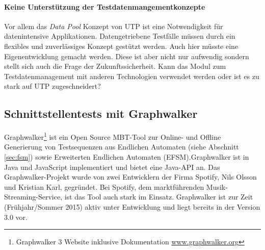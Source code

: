 \paragraph{Keine Unterstützung der Testdatenmangementkonzepte}
Vor allem das \textit{Data Pool} Konzept von UTP ist eine Notwendigkeit für datenintensive Applikationen. Datengetriebene Testfälle müssen durch ein flexibles und zuverlässiges Konzept gestützt werden. Auch hier müsste eine Eigenentwicklung gemacht werden. Diese ist aber nicht nur aufwendig sondern stellt sich auch die Frage der Zukunftssicherheit. Kann das Modul zum Testdatenmanagement mit anderen Technologien verwendet werden oder ist es zu stark auf UTP zugeschneidert?

\subsection{Schnittstellentests mit Graphwalker}
Graphwalker\footnote{Graphwalker 3 Website inklusive Dokumentation \url{www.graphwalker.org}} ist ein Open Source MBT-Tool zur Online- und Offline Generierung von Testsequenzen aus Endlichen Automaten (siehe Abschnitt \ref{sec:fsm}) sowie Erweiterten Endlichen Automaten (EFSM).Graphwalker ist in Java und JavaScript implementiert und bietet eine Java-API an. Das Graphwalker-Projekt wurde von zwei Entwicklern der Firma Spotify, Nils Olsson und Kristian Karl, gegründet. Bei Spotify, dem marktführenden Musik-Streaming-Service, ist das Tool auch stark im Einsatz. Graphwalker ist zur Zeit (Frühjahr/Sommer 2015) aktiv unter Entwicklung und liegt bereits in der Version 3.0 vor.

